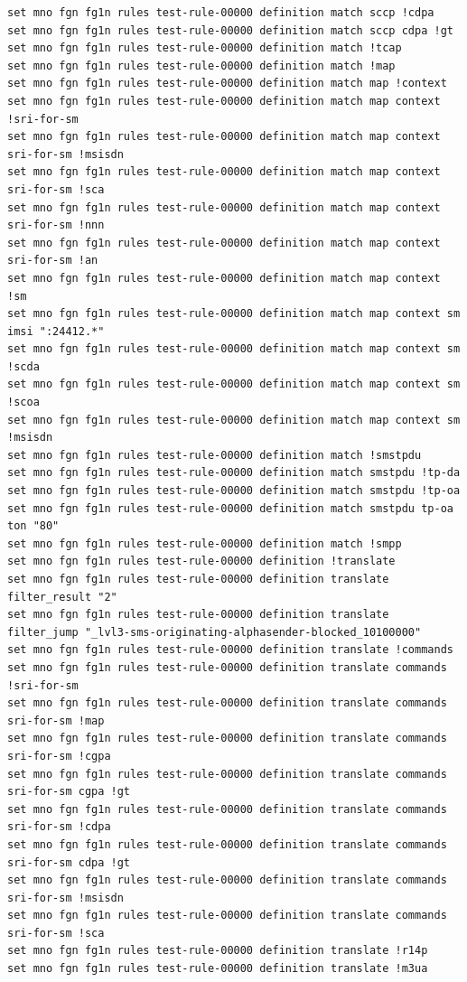 \documentclass[a4paper,latin]{paper}
\begin{document}
\begin{lstlisting}[style=BashInputStyle]
set mno fgn fg1n rules test-rule-00000 definition match sccp !cdpa
set mno fgn fg1n rules test-rule-00000 definition match sccp cdpa !gt
set mno fgn fg1n rules test-rule-00000 definition match !tcap
set mno fgn fg1n rules test-rule-00000 definition match !map
set mno fgn fg1n rules test-rule-00000 definition match map !context
set mno fgn fg1n rules test-rule-00000 definition match map context !sri-for-sm
set mno fgn fg1n rules test-rule-00000 definition match map context sri-for-sm !msisdn
set mno fgn fg1n rules test-rule-00000 definition match map context sri-for-sm !sca
set mno fgn fg1n rules test-rule-00000 definition match map context sri-for-sm !nnn
set mno fgn fg1n rules test-rule-00000 definition match map context sri-for-sm !an
set mno fgn fg1n rules test-rule-00000 definition match map context !sm
set mno fgn fg1n rules test-rule-00000 definition match map context sm imsi ":24412.*"
set mno fgn fg1n rules test-rule-00000 definition match map context sm !scda
set mno fgn fg1n rules test-rule-00000 definition match map context sm !scoa
set mno fgn fg1n rules test-rule-00000 definition match map context sm !msisdn
set mno fgn fg1n rules test-rule-00000 definition match !smstpdu
set mno fgn fg1n rules test-rule-00000 definition match smstpdu !tp-da
set mno fgn fg1n rules test-rule-00000 definition match smstpdu !tp-oa
set mno fgn fg1n rules test-rule-00000 definition match smstpdu tp-oa ton "80"
set mno fgn fg1n rules test-rule-00000 definition match !smpp
set mno fgn fg1n rules test-rule-00000 definition !translate
set mno fgn fg1n rules test-rule-00000 definition translate filter_result "2"
set mno fgn fg1n rules test-rule-00000 definition translate filter_jump "_lvl3-sms-originating-alphasender-blocked_10100000"
set mno fgn fg1n rules test-rule-00000 definition translate !commands
set mno fgn fg1n rules test-rule-00000 definition translate commands !sri-for-sm
set mno fgn fg1n rules test-rule-00000 definition translate commands sri-for-sm !map
set mno fgn fg1n rules test-rule-00000 definition translate commands sri-for-sm !cgpa
set mno fgn fg1n rules test-rule-00000 definition translate commands sri-for-sm cgpa !gt
set mno fgn fg1n rules test-rule-00000 definition translate commands sri-for-sm !cdpa
set mno fgn fg1n rules test-rule-00000 definition translate commands sri-for-sm cdpa !gt
set mno fgn fg1n rules test-rule-00000 definition translate commands sri-for-sm !msisdn
set mno fgn fg1n rules test-rule-00000 definition translate commands sri-for-sm !sca
set mno fgn fg1n rules test-rule-00000 definition translate !r14p
set mno fgn fg1n rules test-rule-00000 definition translate !m3ua

\end{lstlisting}
\end{document}
